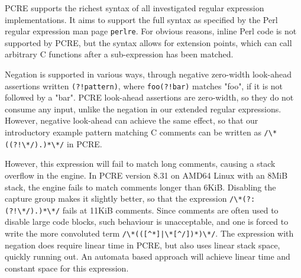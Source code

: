 PCRE supports the richest syntax of all investigated regular expression
implementations. It aims to support the full syntax as specified by the Perl
regular expression man page \texttt{perlre}. For obvious reasons, inline Perl
code is not supported by PCRE, but the syntax allows for extension points, which
can call arbitrary C functions after a sub-expression has been matched.

Negation is supported in various ways, through negative zero-width look-ahead
assertions written \verb'(?!pattern)', where \verb'foo(?!bar)' matches "foo", if
it is not followed by a "bar". PCRE look-ahead assertions are zero-width, so
they do not consume any input, unlike the negation in our extended regular
expressions. However, negative look-ahead can achieve the same effect, so that
our introductory example pattern matching C comments can be written as
\verb'/\*((?!\*/).)*\*/' in PCRE.

However, this expression will fail to match long comments, causing a stack
overflow in the engine. In PCRE version 8.31 on AMD64 Linux with an 8MiB stack,
the engine fails to match comments longer than 6KiB. Disabling the capture group
makes it slightly better, so that the expression \verb'/\*(?:(?!\*/).)*\*/'
fails at 11KiB comments. Since comments are often used to disable large code
blocks, such behaviour is unacceptable, and one is forced to write the more
convoluted term \verb'/\*(([^*]|\*[^/])*)\*/'. The expression with negation does
require linear time in PCRE, but also uses linear stack space, quickly running
out. An automata based approach will achieve linear time and constant space for
this expression.


